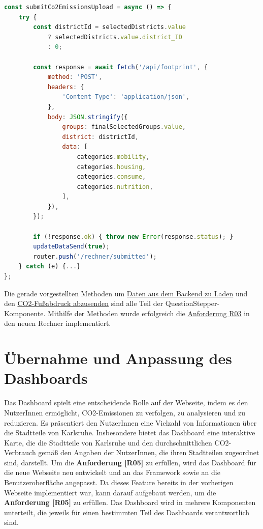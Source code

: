 \begin{lstlisting}[language={JavaScript}, caption={submitCo2EmissionUpload()-Methode}, label={lst:upload-methode}]
const submitCo2EmissionsUpload = async () => {
    try {
        const districtId = selectedDistricts.value
            ? selectedDistricts.value.district_ID
            : 0;

        const response = await fetch('/api/footprint', {
            method: 'POST',
            headers: {
                'Content-Type': 'application/json',
            },
            body: JSON.stringify({
                groups: finalSelectedGroups.value,
                district: districtId,
                data: [
                    categories.mobility,
                    categories.housing,
                    categories.consume,
                    categories.nutrition,
                ],
            }),
        });

        if (!response.ok) { throw new Error(response.status); }
        updateDataSend(true);
        router.push('/rechner/submitted');
    } catch (e) {...}
};
\end{lstlisting}

Die gerade vorgestellten Methoden um \hyperref[lst:daten-aus-backend]{Daten aus dem Backend zu Laden} und den \hyperref[lst:upload-methode]{CO2-Fußabdruck abzusenden} sind alle Teil der QuestionStepper-Komponente. Mithilfe der Methoden wurde erfolgreich die \hyperref[sec:hochladen-von-co2daten]{Anforderung R03} in den neuen Rechner implementiert.

\section{Übernahme und Anpassung des Dashboards}

Das Dashboard spielt eine entscheidende Rolle auf der Webseite, indem es den NutzerInnen ermöglicht, CO2-Emissionen zu verfolgen, zu analysieren und zu reduzieren. Es präsentiert den NutzerInnen eine Vielzahl von Informationen über die Stadtteile von Karlsruhe. Insbesondere bietet das Dashboard eine interaktive Karte, die die Stadtteile von Karlsruhe und den durchschnittlichen CO2-Verbrauch gemäß den Angaben der NutzerInnen, die ihren Stadtteilen zugeordnet sind, darstellt. Um die \textbf{Anforderung [R05]} zu erfüllen, wird das Dashboard für die neue Webseite neu entwickelt und an das Framework sowie an die Benutzeroberfläche angepasst. Da dieses Feature bereits in der vorherigen Webseite implementiert war, kann darauf aufgebaut werden, um die \textbf{Anforderung [R05]} zu erfüllen. Das Dashboard wird in mehrere Komponenten unterteilt, die jeweils für einen bestimmten Teil des Dashboards verantwortlich sind.

